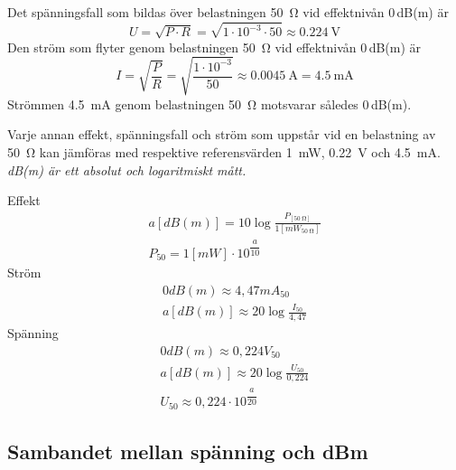 Det spänningsfall som bildas över belastningen \qty{50}{\ohm} vid effektnivån
0\,dB(m) är
\[U = \sqrt{P\cdot R} = \sqrt{1\cdot 10^{-3} \cdot 50} \approx \qty{0,224}{\volt}\]
Den ström som flyter genom belastningen \qty{50}{\ohm} vid effektnivån 0\,dB(m)
är
\[
I = \sqrt{\frac{P}{R}} = \sqrt{\frac{1\cdot 10^{-3}}{50}} \approx \qty{0,0045}{\ampere} = \qty{4,5}{\milli\ampere}
\]
Strömmen \qty{4,5}{\milli\ampere} genom belastningen \qty{50}{\ohm} motsvarar
således 0\,dB(m).

Varje annan effekt, spänningsfall och ström som uppstår vid en belastning av
\qty{50}{\ohm} kan jämföras med respektive referensvärden \qty{1}{\milli\watt},
\qty{0,22}{\volt} och \qty{4,5}{\milli\ampere}.
\emph{dB(m) är ett absolut och logaritmiskt mått.}

\vspace*{1ex}
\noindent
Effekt
\begin{gather*}
	a [dB(m)] = 10 \log\frac{P_{[\qty{50}{\ohm}]}}{1[mW_{\qty{50}{\ohm}}]} \\
	P_{50} = 1 [mW] \cdot 10^{\dfrac{a}{10}}
\end{gather*}
Ström
\begin{gather*}
	0 dB(m) \approx 4,47 mA_{50} \\
	a [dB(m)] \approx 20 \log\frac{I_{50}}{4,47}
\end{gather*}
Spänning
\begin{gather*}
	0 dB(m) \approx 0,224 V_{50} \\
	a [dB(m)] \approx 20 \log\frac{U_{50}}{0,224} \\
	U_{50} \approx 0,224 \cdot 10^{\dfrac{a}{20}}
\end{gather*}

\subsection[Sambandet spänning och dBm]{Sambandet mellan spänning och dBm}

